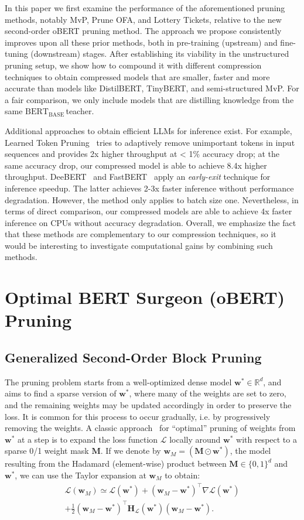 \documentclass[11pt]{article}
\newcommand{\vect}[1]{\mathbf{#1}}
\newcommand{\wm}{\vect{w}_M}
\newcommand{\ws}{\vect{w}^*}
\newcommand{\w}{\mathbf{w}}
\newcommand{\hess}{\vect{H_{\mathcal{L}}}}
\newcommand{\bert}{$\textrm{BERT}_{\textrm{BASE}}\,$}
\begin{document}
In this paper we first examine the performance of the aforementioned pruning methods, notably MvP, Prune OFA, and Lottery Tickets, relative to the new second-order oBERT pruning method. The approach we propose consistently improves upon all these prior methods, both in pre-training (upstream) and fine-tuning (downstream) stages. After establishing its viability in the unstructured pruning setup, we show how to compound it with different compression techniques to obtain compressed models that are smaller, faster and more accurate than models like DistilBERT, TinyBERT, and semi-structured MvP. For a fair comparison, we only include models that are distilling knowledge from the same \bert teacher.

Additional approaches to obtain efficient LLMs for inference exist. For example, Learned Token Pruning~\cite{kim2021learned} tries to adaptively remove unimportant tokens in input sequences and provides 2x higher throughput at < 1\% accuracy drop; at the same accuracy drop, our compressed model is able to achieve 8.4x higher throughput. DeeBERT~\cite{Xin2020DeeBERTDE} and FastBERT~\cite{liu2020fastbert} apply an \emph{early-exit} technique for inference speedup. The latter achieves 2-3x faster inference without performance degradation. However, the method only applies to batch size one. Nevertheless, in terms of direct comparison, our compressed models are able to achieve 4x faster inference on CPUs without accuracy degradation. 
Overall, we emphasize the fact that these methods are complementary to our compression techniques, so it would be interesting to investigate computational gains by combining such methods.

\section{Optimal BERT Surgeon (oBERT) Pruning}
\label{sec:obs}

\subsection{Generalized Second-Order Block Pruning}

The pruning problem starts from a well-optimized dense model \( \ws \in \mathbb{R}^d \), and aims to find a sparse version of $\ws$, where many of the weights are set to zero, 
and the remaining weights may be updated accordingly in order to preserve the loss. 
It is common for this process to occur gradually, i.e. by progressively removing the weights. 
A classic approach~\cite{LeCun1989OptimalBD, hassibi1993second}  for ``optimal'' pruning of weights from $\ws$ at a step is to expand the loss function $\mathcal{L}$ locally around $\ws$ with respect to a sparse 0/1 weight mask $\vect{M}$. If we denote by $\w_M = (\vect{M} \odot \ws)$, the model resulting from the Hadamard (element-wise) product between \( \vect{M} \in \{0,1\}^d \) and $\ws$, we can use the Taylor expansion at $\w_M$ to obtain: 
\begin{eqnarray*}
    \mathcal{L}(\wm) \simeq \mathcal{L}(\ws) + (\wm - \ws)^\top \nabla \mathcal{L}(\ws) \\ + \frac{1}{2} (\wm - \ws)^\top \hess (\ws) (\wm - \ws). 
\end{eqnarray*}
\end{document}
